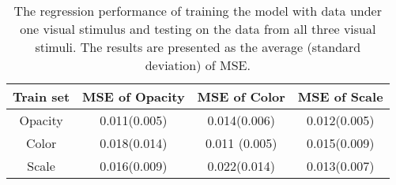\begin{table}[htb]
  \centering
  \small
    \begin{tabular}[width=\columnwidth]{cccc}
    \toprule
    \textbf{Train set} & \textbf{MSE of Opacity} & \textbf{MSE of Color} & \textbf{MSE of Scale} \\
    \midrule
    Opacity & 0.011(0.005) & 0.014(0.006) & 0.012(0.005) \\
    Color & 0.018(0.014) & 0.011 (0.005) & 0.015(0.009) \\
    Scale & 0.016(0.009) & 0.022(0.014) & 0.013(0.007) \\
    \bottomrule
    \end{tabular}
    \caption{The regression performance of training the model with data under one visual stimulus and testing on the data from all three visual stimuli. The results are presented as the average (standard deviation) of MSE.}
    \label{table:evaluationresult}
\end{table}
